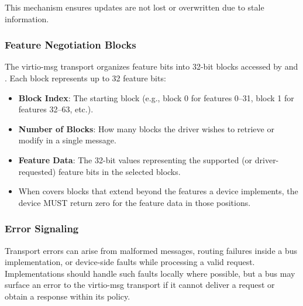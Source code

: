 This mechanism ensures updates are not lost or overwritten due to stale
information.

\subsubsection{Feature Negotiation Blocks}
\label{sec:Virtio Transport Options / Virtio Over Messages / Basic Concepts / FeatureBlocks}

The virtio-msg transport organizes feature bits into 32-bit blocks accessed by
 and . Each block
represents up to 32 feature bits:

\begin{itemize}
  \item \textbf{Block Index}: The starting block (e.g., block 0 for
        features 0--31, block 1 for features 32--63, etc.).
  \item \textbf{Number of Blocks}: How many blocks the driver wishes to retrieve
        or modify in a single message.
  \item \textbf{Feature Data}: The 32-bit values representing the supported (or
        driver-requested) feature bits in the selected blocks.
\end{itemize}

\begin{itemize}
  \item When  covers blocks that extend beyond the
        features a device implements, the device MUST return zero for the
        feature data in those positions.
\end{itemize}

\subsubsection{Error Signaling}
\label{sec:Virtio Transport Options / Virtio Over Messages / Basic Concepts / ErrorSignaling}

Transport errors can arise from malformed messages, routing failures inside a
bus implementation, or device-side faults while processing a valid request.
Implementations should handle such faults locally where possible, but a bus may
surface an error to the virtio-msg transport if it cannot deliver a request or
obtain a response within its policy.

